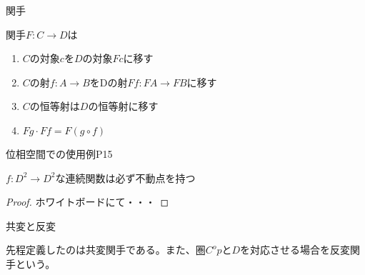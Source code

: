\documentclass[unicode,12pt,aspectratio=169]{beamer}
\begin{document}
\begin{frame}{関手}
    \begin{tcolorbox}
        \begin{definition}
            関手$F:C \rightarrow D$は
            \begin{enumerate}
                \item $C$の対象$c$を$D$の対象$F c$に移す
                \item $C$の射$f:A\rightarrow B$をDの射$F f:F A \rightarrow F B$に移す
                \item $C$の恒等射は$D$の恒等射に移す
                \item $F g\cdot F f=F(g \circ f)$
            \end{enumerate}
        \end{definition}
    \end{tcolorbox}
\end{frame}
\begin{frame}{位相空間での使用例P15}
    \begin{tcolorbox}
        \begin{theorem}
            $f:D^2 \rightarrow D^2$な連続関数は必ず不動点を持つ
        \end{theorem}
        \begin{proof}
            ホワイトボードにて・・・
        \end{proof}
    \end{tcolorbox}
\end{frame}
\begin{frame}{共変と反変}
    \begin{tcolorbox}
        \begin{definition}
            先程定義したのは共変関手である。また、圏$C^op$と$D$を対応させる場合を反変関手という。
        \end{definition}
    \end{tcolorbox}
\end{frame}
\begin{frame}{}
    \begin{tcolorbox}
    \end{tcolorbox}
\end{frame}
\end{document}
